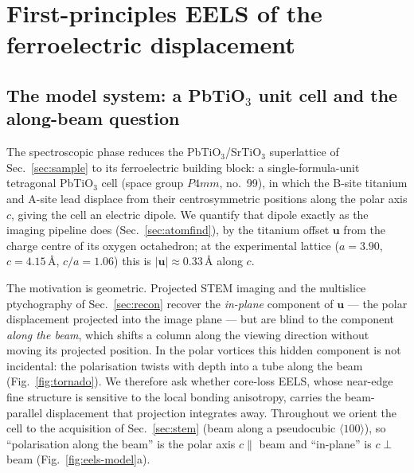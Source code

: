 \section{First-principles EELS of the ferroelectric displacement}
\label{sec:eels}

\subsection{The model system: a PbTiO$_3$ unit cell and the along-beam question}
\label{sec:eels-sample}

The spectroscopic phase reduces the PbTiO$_3$/SrTiO$_3$ superlattice of Sec.~\ref{sec:sample}
to its ferroelectric building block: a single-formula-unit tetragonal PbTiO$_3$ cell (space
group $P4mm$, no.\ 99), in which the B-site titanium and A-site lead displace from their
centrosymmetric positions along the polar axis $c$, giving the cell an electric dipole. We
quantify that dipole exactly as the imaging pipeline does (Sec.~\ref{sec:atomfind}), by the
titanium offset $\mathbf{u}$ from the charge centre of its oxygen octahedron; at the
experimental lattice ($a=3.90$, $c=4.15$\,\AA, $c/a=1.06$) this is $|\mathbf{u}|\approx
0.33$\,\AA{} along $c$.

The motivation is geometric. Projected STEM imaging and the multislice ptychography of
Sec.~\ref{sec:recon} recover the \emph{in-plane} component of $\mathbf{u}$ --- the polar
displacement projected into the image plane --- but are blind to the component \emph{along the
beam}, which shifts a column along the viewing direction without moving its projected
position. In the polar vortices this hidden component is not incidental: the polarisation
twists with depth into a tube along the beam (Fig.~\ref{fig:tornado}). We therefore ask
whether core-loss EELS, whose near-edge fine structure is sensitive to the local bonding
anisotropy, carries the beam-parallel displacement that projection integrates away. Throughout
we orient the cell to the acquisition of Sec.~\ref{sec:stem} (beam along a pseudocubic
$\langle 100\rangle$), so ``polarisation along the beam'' is the polar axis $c\parallel$ beam
and ``in-plane'' is $c\perp$ beam (Fig.~\ref{fig:eels-model}a).

